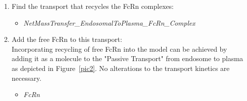 \documentclass[fleqn,10pt]{physiome}
\begin{document}
\begin{enumerate}[label=(\roman*)]
    \item {Find the transport that recycles the FcRn complexes:}
    \begin{itemize}
        \item \textit{NetMassTransfer\_EndosomalToPlasma\_FcRn\_Complex}
    \end{itemize}
    \item {Add the free FcRn to this transport:} \\
Incorporating recycling of free FcRn into the model can be achieved by adding it as a molecule to the "Passive Transport" from endosome to plasma as depicted in Figure~\ref{pic2}. No alterations to the transport kinetics are necessary.
    \begin{itemize}
        \item \textit{FcRn}
    \end{itemize}
\end{enumerate}
\end{document}
